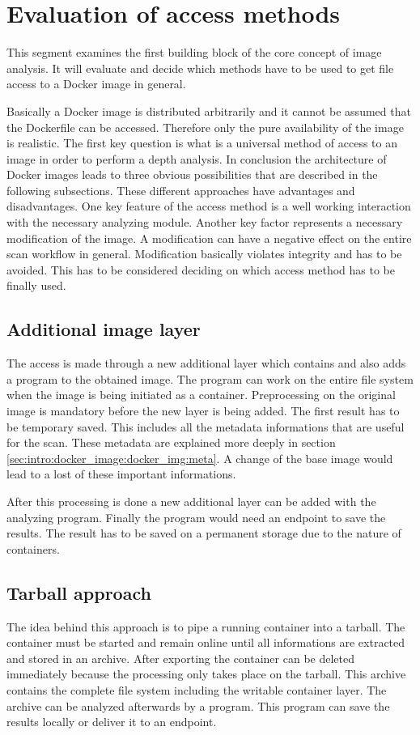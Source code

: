 \section{Evaluation of access methods}
\label{ch:theory:access_eval}
This segment examines the first building block of the core concept of image analysis.
It will evaluate and decide which methods have to be used to get file access to a Docker image in general.

Basically a Docker image is distributed arbitrarily and it cannot be assumed that the Dockerfile can be accessed.
Therefore only the pure availability of the image is realistic.
The first key question is what is a universal method of access to an image in order to perform a depth analysis.
In conclusion the architecture of Docker images leads to three obvious possibilities that are described in the following subsections.
These different approaches have advantages and disadvantages.
One key feature of the access method is a well working interaction with the necessary analyzing module.
Another key factor represents a necessary modification of the image. 
A modification can have a negative effect on the entire scan workflow in general.
Modification basically violates integrity and has to be avoided.
This has to be considered deciding on which access method has to be finally used.

\subsection{Additional image layer} 
\label{ch:theory:access_eval:additional}
The access is made through a new additional layer which contains and also adds a program to the obtained image. 
The program can work on the entire file system when the image is being initiated as a container.
Preprocessing on the original image is mandatory before the new layer is being added. 
The first result has to be temporary saved. 
This includes all the metadata informations that are useful for the scan. 
These metadata are explained more deeply in section \ref{sec:intro:docker_image:docker_img:meta}. 
A change of the base image would lead to a lost of these important informations.

After this processing is done a new additional layer can be added with the analyzing program.
Finally the program would need an endpoint to save the results. 
The result has to be saved on a permanent storage due to the nature of containers.

\subsection{Tarball approach} 
\label{ch:theory:access_eval:tarball}
The idea behind this approach is to pipe a running container into a tarball. The container must be started and remain online until all informations are extracted and stored in an archive.
After exporting the container can be deleted immediately because the processing only takes place on the tarball.
This archive contains the complete file system including the writable container layer. The archive can be analyzed afterwards by a program. This program can save the results locally or deliver it to an endpoint.

